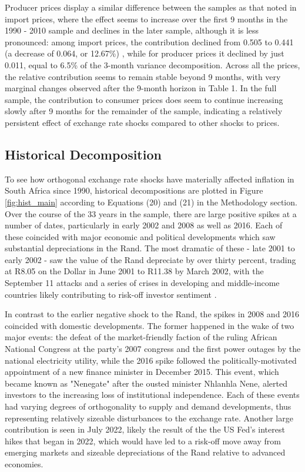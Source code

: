 \documentclass[12pt]{article}
\begin{document}
 Producer prices display a similar difference between the samples as that noted in import prices, where the effect seems to increase over the first 9 months in the 1990 - 2010 sample and declines in the later sample, although it is less pronounced: among import prices, the contribution declined from 0.505 to 0.441 (a decrease of 0.064, or 12.67\%) , while for producer prices it declined by just 0.011, equal to 6.5\% of the 3-month variance decomposition. Across all the prices, the relative contribution seems to remain stable beyond 9 months, with very marginal changes observed after the 9-month horizon in Table 1. In the full sample, the contribution to consumer prices does seem to continue increasing slowly after 9 months for the remainder of the sample, indicating a relatively persistent effect of exchange rate shocks compared to other shocks to prices. 

\subsection{Historical Decomposition}

To see how orthogonal exchange rate shocks have materially affected inflation in South Africa since 1990, historical decompositions are plotted in Figure \ref{fig:hist_main} according to Equations (20) and (21) in the Methodology section. Over the course of the 33 years in the sample, there are large positive spikes at a number of dates, particularly in early 2002 and 2008 as well as 2016. Each of these coincided with major economic and political developments which saw substantial depreciations in the Rand. The most dramatic of these - late 2001 to early 2002 -  saw the value of the Rand depreciate by over thirty percent, trading at R8.05 on the Dollar in June 2001 to R11.38 by March 2002, with the September 11 attacks and a series of crises in developing and middle-income countries likely contributing to risk-off investor sentiment \parencite{sarb2002qb, sarb2001qb}. 

In contrast to the earlier negative shock to the Rand, the spikes in 2008 and 2016 coincided with domestic developments. The former happened in the wake of two major events: the defeat of the market-friendly faction of the ruling African National Congress at the party's 2007 congress and the first power outages by the national electricity utility, while the 2016 spike followed the politically-motivated appointment of a new finance minister in December 2015. This event, which became known as "Nenegate" after the ousted minister Nhlanhla Nene,  alerted investors to the increasing loss of institutional independence. Each of these events had varying degrees of orthogonality to supply and demand developments, thus representing relatively sizeable disturbances to the exchange rate. Another large contribution is seen in July 2022, likely the result of  the the US Fed's interest hikes that began in 2022, which would have led to a risk-off move away from emerging markets and sizeable depreciations of the Rand relative to advanced economies. 
\end{document}
